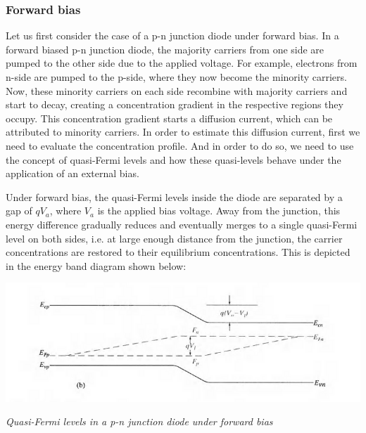 \documentclass[12 pt]{article}
\begin{document}
\subsubsection{Forward bias}

Let us first consider the case of a p-n junction diode under forward bias. In a forward biased p-n junction diode, the majority carriers from one side are pumped to the other side due to the applied voltage. For example, electrons from n-side are pumped to the p-side, where they now become the minority carriers. Now, these minority carriers on each side recombine with majority carriers and start to decay, creating a concentration gradient in the respective regions they occupy. This concentration gradient starts a diffusion current, which can be attributed to minority carriers. In order to estimate this diffusion current, first we need to evaluate the concentration profile. And in order to do so, we need to use the concept of quasi-Fermi levels and how these quasi-levels behave under the application of an external bias. \par

Under forward bias, the quasi-Fermi levels inside the diode are separated by a gap of $qV_{a}$, where $V_{a}$ is the applied bias voltage. Away from the junction, this energy difference gradually reduces and eventually merges to a single quasi-Fermi level on both sides, i.e. at large enough distance from the junction, the carrier concentrations are restored to their equilibrium concentrations. This is depicted in the energy band diagram shown below: \newline

\par
\begin{center}
    \includegraphics{diode_energy_bands_1.png}
\end{center}
\begin{center}
    \emph{\hspace{1 cm}Quasi-Fermi levels in a p-n junction diode under forward bias\newline}
\end{center}
\par
\end{document}
